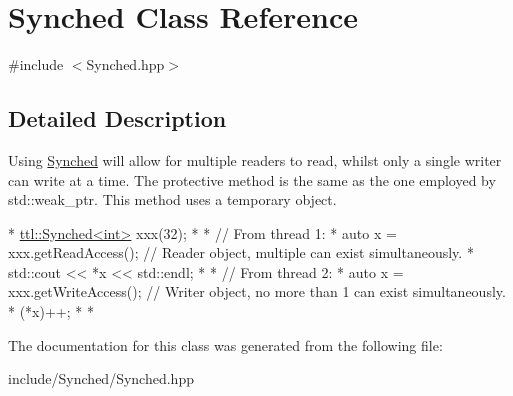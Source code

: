 \hypertarget{class_synched}{\section{Synched Class Reference}
\label{class_synched}
}


{\ttfamily \#include $<$Synched.\-hpp$>$}



\subsection{Detailed Description}
Using \hyperlink{class_synched}{Synched} will allow for multiple readers to read, whilst only a single writer can write at a time. The protective method is the same as the one employed by std\-::weak\-\_\-ptr. This method uses a temporary object.


\begin{DoxyCode}
*  \hyperlink{classttl_1_1_synched}{ttl::Synched<int>} xxx(32);
* 
*  \textcolor{comment}{// From thread 1:}
*  \textcolor{keyword}{auto} x = xxx.getReadAccess(); \textcolor{comment}{// Reader object, multiple can exist simultaneously.}
*  std::cout << *x << std::endl;
* 
*  \textcolor{comment}{// From thread 2:}
*  \textcolor{keyword}{auto} x = xxx.getWriteAccess(); \textcolor{comment}{// Writer object, no more than 1 can exist simultaneously.}
*  (*x)++;
* 
*  
\end{DoxyCode}
 

The documentation for this class was generated from the following file\-:\begin{DoxyCompactItemize}
\item 
include/\-Synched/Synched.\-hpp\end{DoxyCompactItemize}
